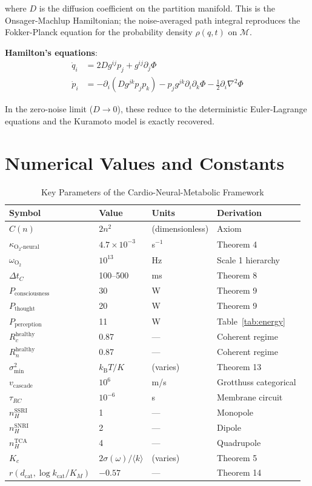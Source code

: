 \documentclass[12pt,a4paper]{article}
\theoremstyle{definition}
\newcommand{\kBT}{k_{\text{B}}T}
\newcommand{\calM}{\mathcal{M}}
\newcommand{\dcat}{d_{\text{cat}}}
\begin{document}
where $D$ is the diffusion coefficient on the partition manifold. This is
the Onsager-Machlup Hamiltonian; the noise-averaged path integral reproduces
the Fokker-Planck equation for the probability density $\rho(q,t)$ on $\calM$.

\textbf{Hamilton's equations}:
\begin{align}
\dot{q}_i &= 2D g^{ij} p_j + g^{ij}\partial_j\Phi\\
\dot{p}_i &= -\partial_i(D g^{jk} p_j p_k) - p_j g^{jk}\partial_i\partial_k\Phi - \frac{1}{2}\partial_i\nabla^2\Phi
\end{align}

In the zero-noise limit ($D \to 0$), these reduce to the deterministic Euler-Lagrange
equations and the Kuramoto model is exactly recovered.

\section{Numerical Values and Constants}
\label{app:constants}

\begin{table}[H]
\centering
\caption{Key Parameters of the Cardio-Neural-Metabolic Framework}
\begin{tabular}{llll}
\toprule
\textbf{Symbol} & \textbf{Value} & \textbf{Units} & \textbf{Derivation}\\
\midrule
$C(n)$ & $2n^2$ & (dimensionless) & Axiom\\
$\kappa_{\text{O}_2\text{-neural}}$ & $4.7 \times 10^{-3}$ & s$^{-1}$ & Theorem 4\\
$\omega_{\text{O}_2}$ & $10^{13}$ & Hz & Scale 1 hierarchy\\
$\Delta t_C$ & 100--500 & ms & Theorem 8\\
$P_{\text{consciousness}}$ & 30 & W & Theorem 9\\
$P_{\text{thought}}$ & 20 & W & Theorem 9\\
$P_{\text{perception}}$ & 11 & W & Table~\ref{tab:energy}\\
$R_c^{\text{healthy}}$ & 0.87 & — & Coherent regime\\
$R_n^{\text{healthy}}$ & 0.87 & — & Coherent regime\\
$\sigma^2_{\min}$ & $\kBT/K$ & (varies) & Theorem 13\\
$v_{\text{cascade}}$ & $10^6$ & m/s & Grotthuss categorical\\
$\tau_{RC}$ & $10^{-6}$ & s & Membrane circuit\\
$n_H^{\text{SSRI}}$ & 1 & — & Monopole\\
$n_H^{\text{SNRI}}$ & 2 & — & Dipole\\
$n_H^{\text{TCA}}$ & 4 & — & Quadrupole\\
$K_c$ & $2\sigma(\omega)/\langle k\rangle$ & (varies) & Theorem 5\\
$r(\dcat, \log k_{\text{cat}}/K_M)$ & $-0.57$ & — & Theorem 14\\
\bottomrule
\end{tabular}
\end{table}
\end{document}

